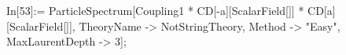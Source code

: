 In[53]:= ParticleSpectrum[Coupling1 * CD[-a][ScalarField[]] * CD[a][ScalarField[]], TheoryName -> NotStringTheory, Method -> "Easy", MaxLaurentDepth -> 3]; 